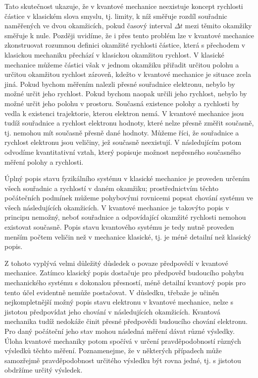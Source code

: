 Tato skutečnost ukazuje, že v kvantové mechanice neexistuje koncept rychlosti částice v klasickém slova smyslu, tj. limity, k níž směřuje rozdíl souřadnic naměřených ve dvou okamžicích, pokud časový interval \(\Delta t\) mezi těmito okamžiky směřuje k nule. Později uvidíme, že i přes tento problém lze v kvantové mechanice zkonstruovat rozumnou definici okamžité rychlosti částice, která s přechodem v klasickou mechaniku přechází v klasickou okamžitou rychlost. V klasické mechanice můžeme částici však v jednom okamžiku přiřadit určitou polohu a určitou okamžitou rychlost zároveň, kdežto v kvantové mechanice je situace zcela jiná. Pokud bychom měřením nalezli přesné souřadnice elektronu, nebylo by možné určit jeho rychlost. Pokud bychom naopak určili jeho rychlost, nebylo by možné určit jeho polohu v prostoru. Současná existence polohy a rychlosti by vedla k existenci trajektorie, kterou elektron nemá. V kvantové mechanice jsou tudíž souřadnice a rychlost elektronu hodnoty, které nelze přesně změřit současně, tj. nemohou mít současně přesně dané hodnoty. Můžeme říci, že souřadnice a rychlost elektronu jsou veličiny, jež současně neexistují. V následujícím potom odvodíme kvantitativní vztah, který popisuje možnost nepřesného současného měření polohy a rychlosti.\par
Úplný popis stavu fyzikálního systému v klasické mechanice je proveden určením všech souřadnic a rychlostí v daném okamžiku; prostřednictvím těchto počátečních podmínek můžeme pohybovými rovnicemi popsat chování systému ve všech následujících okamžicích. V kvantové mechanice je takovýto popis v principu nemožný, neboť souřadnice a odpovídající okamžité rychlosti nemohou existovat současně. Popis stavu kvantového systému je tedy nutně proveden menším počtem veličin než v mechanice klasické, tj. je méně detailní než klasický popis.\par
Z tohoto vyplývá velmi důležitý důsledek o povaze předpovědí v kvantové mechanice. Zatímco klasický popis dostačuje pro předpověď budoucího pohybu mechanického systému s dokonalou přesností, méně detailní kvantový popis pro tento účel evidentně nemůže postačovat. V důsledku, třebaže je učiněn nejkompletnější možný popis stavu elektronu v kvantové mechanice, nelze s jistotou předpovídat jeho chování v následujících okamžicích. Kvantová mechanika tudíž nedokáže činit přesné předpovědi budoucího chování elektronu. Pro daný počáteční jeho stav mohou následná měření dávat různé výsledky. Úloha kvantové mechaniky potom spočívá v určení pravděpodobností různých výsledků těchto měření. Poznamenejme, že v některých případech může samozřejmě pravděpodobnost určitého výsledku být rovna jedné, tj. s jistotou obdržíme určitý výsledek.\par
